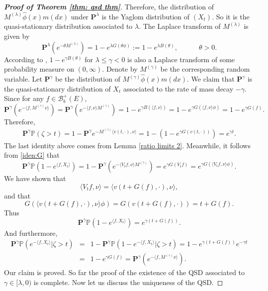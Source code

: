 \documentclass[12pt,a4paper]{amsart}
\theoremstyle{plain}
\theoremstyle{definition}
\numberwithin{equation}{section}
\begin{document}
\begin{proof}[{\bf Proof of Theorem \ref{thm: qsd thm}}]
Therefore, the distribution of $M^{(\lambda)}\hat\phi(x)m(dx)$ under $\mathbf P^{\lambda }$ is the Yaglom distribution of $(X_t)$.  So it is the quasi-stationary distribution associated to $\lambda$.  The Laplace transform of $M^{(\lambda)}$ is given by
\begin{equation}\label{def of Y}
\mathbf P^{\lambda}(e^{-\theta M^{(\lambda)}})=1-e^{\lambda G(\theta\phi)}:=1-e^{\lambda B(\theta)},\qquad\quad\theta>0.
\end{equation}
According to \cite[Lemma $3.2$]{Lambert2007Quasi-stationary}, $1-e^{\gamma B(\theta)}$ for $\lambda\leq \gamma<0$ is also a Laplace transform of some probability measure on $(0,\infty)$.  Denote by $M^{(\gamma)}$ be the corresponding random variable.  Let $\mathbf P^{\gamma}$ be the distribution of $M^{(\gamma)}\hat\phi(x)m(dx)$.  We claim that $\mathbf P^{\gamma}$ is the quasi-stationary distribution of $X_t$ associated to the rate of mass decay $-\gamma$.  Since for any $f\in\mathcal B_b^+(E)$,
\[
\mathbf P^{\gamma}(e^{-\langle f,M^{(\gamma)}\nu\rangle })=\mathbf P^{\gamma}(e^{-\langle f,\nu\rangle M^{(\gamma)}})=1-e^{\gamma B(\langle f,\nu\rangle )}=1-e^{\gamma G(\langle f,\nu\rangle \phi)}=1-e^{\gamma G(f)}.
\]
Therefore,
\begin{eqnarray*}
\mathbf P^{\gamma}\mathbb P(\zeta>t)=1-\mathbf P^{\gamma}e^{-M^{(\gamma)}\langle v(t,\cdot),\nu\rangle }=1-(1-e^{\gamma G(v(t,\cdot))})=e^{\gamma t}.
\end{eqnarray*}
The last identity above comes from Lemma \ref{ratio limits 2}. Meanwhile, it follows from \eqref{iden:G} that
\[
\mathbf P^{\gamma}\mathbb P\left(1-e^{\langle f, X_t\rangle }\right)=1-\mathbf P^{\gamma}\left(e^{-\langle V_tf,\nu\rangle M^{(\gamma)}}\right)
=e^{\gamma G(V_tf)}=e^{\gamma G(\langle V_tf,\nu\rangle\phi)}.
\]
 We have shown that
\begin{equation}\label{ident: Vv}
\langle V_tf,\nu\rangle =\langle v(t+G(f),\cdot),\nu\rangle,
\end{equation}
and that
\begin{equation}\label{ident: Gv}
 G(\langle v(t+G(f),\cdot),\nu\rangle \phi)=G(v(t+G(f),\cdot))=t+G(f).
\end{equation}
Thus
\[
\mathbf P^{\gamma}\mathbb P\left(1-e^{\langle f, X_t\rangle }\right)=e^{\gamma(t+G(f))}.
\]
And furthermore,
\begin{eqnarray*}
\mathbf P^{\gamma}\mathbb P\left(e^{-\langle f, X_t\rangle }\big|\zeta>t\right)&=&1-\mathbf P^{\gamma}\mathbb P\left(1-e^{-\langle f, X_t\rangle }\big|\zeta>t\right)=1-e^{\gamma(t+G(f))}e^{-\gamma t}\\
&=&1-e^{\gamma G(f)}=\mathbf P^{\gamma}(e^{-\langle f,M^{(\gamma)}\nu\rangle }).
\end{eqnarray*}
Our claim is proved.  So far the proof of the existence of the QSD associated to $\gamma\in[\lambda,0)$ is complete.  Now let us discuss the uniqueness of the QSD.


\end{proof}
\end{document}
